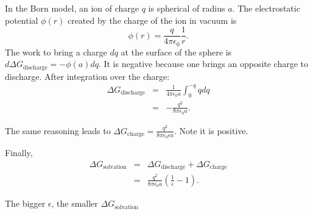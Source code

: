 \documentclass[aps,prl,preprint,groupedaddress]{revtex4-1}
\begin{document}
In the Born model, an ion of charge $q$ is spherical of radius $a$. The electrostatic potential $\phi(r)$ created by the charge
of the ion in vacuum is
\begin{equation}
    \phi(r)=\frac{q}{4\pi\epsilon_0}\frac{1}{r}.
\end{equation}
The work to bring a charge $dq$ at the surface of the sphere is $d\Delta G_{\text{discharge}} = -\phi(a)dq$. 
It is negative because one brings an opposite charge to discharge.
After integration over the charge:
\begin{eqnarray}
    \Delta G_{\text{discharge}} &=& \frac{1}{4\pi\epsilon_0 a} \int_0^{-q} q dq \\
    &=& -\frac{q^2}{8\pi\epsilon_0 a}.
\end{eqnarray}

The same reasoning leads to $\Delta G_{\text{charge}} = \frac{q^2}{8\pi\epsilon_0 \epsilon a}$. Note it is positive.

Finally,
\begin{eqnarray}
    \Delta G_{\text{solvation}} &=& \Delta G_{\text{discharge}} + \Delta G_{\text{charge}} \\
    &=& \frac{q^2}{8\pi\epsilon_0 a} \left( \frac{1}{\epsilon} - 1 \right).
\end{eqnarray}

The bigger $\epsilon$, the smaller $\Delta G_{\text{solvation}}$


%

\end{document}
